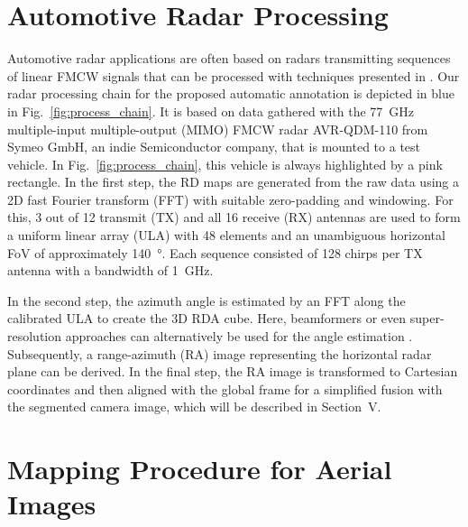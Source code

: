 \documentclass[conference]{IEEEtran}
\begin{document}
%
%
%
\section{Automotive Radar Processing}

Automotive radar applications are often based on radars transmitting sequences of linear FMCW signals that can be processed with techniques presented in \cite{b9}.
Our radar processing chain for the proposed automatic annotation is depicted in blue in Fig.~\ref{fig:process_chain}.
It is based on data gathered with the \SI{77}{\giga\hertz} multiple-input multiple-output (MIMO) FMCW radar AVR-QDM-110 from Symeo GmbH, an indie Semiconductor company, that is mounted to a test vehicle.
In Fig.~\ref{fig:process_chain}, this vehicle is always highlighted by a pink rectangle.
In the first step, the RD maps are generated from the raw data using a 2D fast Fourier transform (FFT) with suitable zero-padding and windowing.
For this, 3 out of 12 transmit (TX) and all 16 receive (RX) antennas are used to form a uniform linear array (ULA) with 48 elements and an unambiguous horizontal FoV of approximately \SI{140}{\degree}.
Each sequence consisted of \num{128} chirps per TX antenna with a bandwidth of \SI{1}{\giga\hertz}.

In the second step, the azimuth angle is estimated by an FFT along the calibrated ULA to create the 3D RDA cube.
Here, beamformers or even super-resolution approaches can alternatively be used for the angle estimation \cite{b9}.
Subsequently, a range-azimuth (RA) image representing the horizontal radar plane can be derived.
In the final step, the RA image is transformed to Cartesian coordinates and then aligned with the global frame for a simplified fusion with the segmented camera image, which will be described in Section~V.

%
%
%
\section{Mapping Procedure for Aerial Images}
\end{document}
